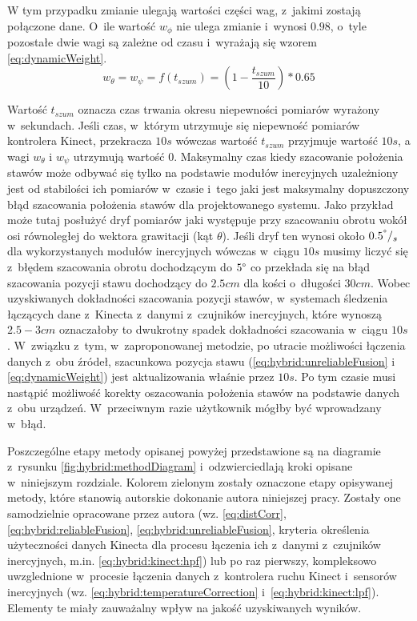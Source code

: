 																
W tym przypadku zmianie ulegają wartości części wag, z~jakimi zostają połączone dane. O~ile wartość $w_\phi$ nie ulega zmianie i~wynosi $0.98$, o~tyle pozostałe dwie wagi są zależne od czasu i~wyrażają się wzorem \ref{eq:dynamicWeight}.
\begin{equation}
	w_{\theta} = w_{\psi} = f(t_{szum}) = (1-\frac{t_{szum}}{10}) * 0.65
	\label{eq:dynamicWeight}
\end{equation}
																
Wartość $t_{szum}$ oznacza czas trwania okresu niepewności pomiarów wyrażony w~sekundach. Jeśli czas, w~którym utrzymuje się niepewność pomiarów kontrolera Kinect, przekracza $10s$ wówczas wartość $t_{szum}$ przyjmuje wartość $10s$, a wagi $w_{\theta}$ i $w_{\psi}$ utrzymują wartość 0. Maksymalny czas kiedy szacowanie położenia stawów może odbywać się tylko na podstawie modułów inercyjnych uzależniony jest od stabilości ich pomiarów w~czasie i~tego jaki jest maksymalny dopuszczony błąd szacowania położenia stawów dla projektowanego systemu. Jako przykład może tutaj posłużyć dryf pomiarów jaki występuje przy szacowaniu obrotu wokół osi równoległej do wektora grawitacji (kąt $\theta$). Jeśli dryf ten wynosi około $0.5^\degree/_s$ dla wykorzystanych modułów inercyjnych wówczas w~ciągu $10s$ musimy liczyć się z~błędem szacowania obrotu dochodzącym do $5\degree$ co przekłada się na błąd szacowania pozycji stawu dochodzący do $2.5cm$ dla kości o~długości $30cm$. Wobec uzyskiwanych dokładności szacowania pozycji stawów, w~systemach śledzenia łączących dane z~Kinecta z~danymi z~czujników inercyjnych, które wynoszą $2.5-3cm$ oznaczałoby to dwukrotny spadek dokładności szacowania w~ciągu $10s$. W~związku z~tym, w~zaproponowanej metodzie, po utracie możliwości łączenia danych z~obu źródeł, szacunkowa pozycja stawu (\eqref{eq:hybrid:unreliableFusion} i \eqref{eq:dynamicWeight}) jest aktualizowania właśnie przez $10s$. Po tym czasie musi nastąpić możliwość korekty oszacowania położenia stawów na podstawie danych z~obu urządzeń. W~przeciwnym razie użytkownik mógłby być wprowadzany w~błąd. 
											

Poszczególne etapy metody opisanej powyżej przedstawione są na diagramie z~rysunku \ref{fig:hybrid:methodDiagram} i~odzwierciedlają kroki opisane w~niniejszym rozdziale. Kolorem zielonym zostały oznaczone etapy opisywanej metody, które stanowią autorskie dokonanie autora niniejszej pracy. Zostały one samodzielnie opracowane przez autora (wz. \eqref{eq:distCorr}, \eqref{eq:hybrid:reliableFusion}, \eqref{eq:hybrid:unreliableFusion}, kryteria określenia użyteczności danych Kinecta dla procesu łączenia ich z~danymi z~czujników inercyjnych, m.in. \eqref{eq:hybrid:kinect:hpf}) lub po raz pierwszy, kompleksowo uwzglednione w~procesie łączenia danych z~kontrolera ruchu Kinect i~sensorów inercyjnych (wz. \eqref{eq:hybrid:temperatureCorrection} i~\eqref{eq:hybrid:kinect:lpf}). Elementy te miały zauważalny wpływ na jakość uzyskiwanych wyników.